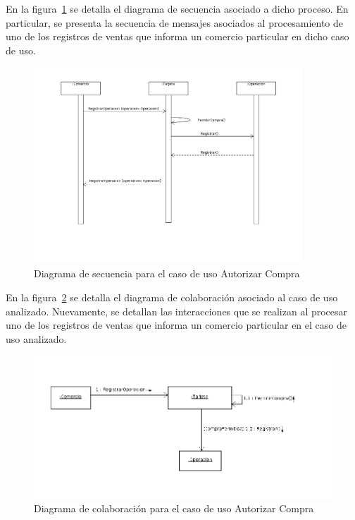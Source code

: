 En la figura~\ref{fig:modobjetos:diagramasecuencia} se detalla el diagrama de 
secuencia asociado a dicho proceso. En particular, se presenta la secuencia de
mensajes asociados al procesamiento de uno de los registros de ventas que 
informa un comercio particular en dicho caso de uso.

\begin{figure}[htb]
\begin{center}
\includegraphics[width=0.9\textwidth]{images/mod_objetos_secuencia.png}
\end{center}
\caption{Diagrama de secuencia para el caso de uso Autorizar Compra}
\label{fig:modobjetos:diagramasecuencia}
\end{figure}

\FloatBarrier

En la figura~\ref{fig:modobjetos:diagramacolaboracion} se detalla el diagrama
de colaboración asociado al caso de uso analizado. Nuevamente, se detallan las
interacciones que se realizan al procesar uno de los registros de ventas que
informa un comercio particular en el caso de uso analizado.

\begin{figure}[htb]
\begin{center}
\includegraphics[width=\textwidth]{images/mod_objetos_colaboracion.png}
\end{center}
\caption{Diagrama de colaboración para el caso de uso Autorizar Compra}
\label{fig:modobjetos:diagramacolaboracion}
\end{figure}

